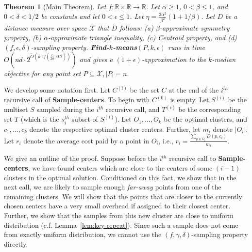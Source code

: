 \documentclass[11pt]{article}
\newtheorem{theorem}{Theorem}
\newcommand{\eps}{{\epsilon}}
\newcommand{\C}[1]{{{C}^{(#1)}}}
\newcommand{\itS}[1]{{{S}^{(#1)}}}
\newcommand{\itT}[1]{{{T}^{(#1)}}}
\begin{document}
\begin{theorem}[Main Theorem]\label{thm:other}
Let $f:\mathbb{R} \times \mathbb{R} \rightarrow \mathbb{R}$. 
Let $\alpha \geq 1$, $0 < \beta \leq 1$, and $0 < \delta < 1/2$ be constants and let $0 < \eps \leq 1$. Let $\eta = \frac{2\alpha^2}{\beta^2}(1 + 1/\beta)$. Let $D$ be a distance measure over space $\mathcal{X}$ that $D$ follows:
(a) $\beta$-approximate symmetry property,
(b) $\alpha$-approximate triangle inequality,
(c) Centroid property, and
(d) $(f, \epsilon, \delta)$-sampling property.
{\bf Find-$k$-means$\left(P, k, \eps \right)$} runs in time $O\left(nd  \cdot 2^{\tilde{O}\left(k \cdot f \left(\frac{\eps}{2 \eta}, 0.2 \right)\right)}\right)$ and gives a $(1 + \epsilon)$-approximation to the $k$-median objective for any point set $P \subseteq \mathcal{X}, |P| = n$.
\end{theorem}

We develop some notation first. 
Let $\C{i}$ be the set $C$ at the end of the $i^{th}$ recursive call of {\bf Sample-centers}.
To begin with $\C{0}$ is empty. 
Let $\itS{i}$ be the multiset $S$ sampled during the $i^{th}$ recursive call, and $\itT{i}$ be the corresponding set $T$ (which is the $s_i^{th}$ subset of $\itS{i}$).
Let $O_1, \ldots, O_k$ be the optimal clusters, and $c_1,...,c_k$ denote the respective optimal cluster centers. 
Further, let $m_i$ denote $|O_i|$.
Let $r_i$ denote the average cost paid by a point in $O_i$, i.e.,
$r_i = \frac{\sum_{p \in O_i} D(p,c_i)}{m_i}$.


We give an outline of the proof. 
Suppose before the  $i^{th}$ recursive call to {\bf Sample-centers}, 
we have found centers which are close to the centers of some $(i-1)$ clusters in the optimal solution. 
Conditioned on this fact, we show that in the next call, we are likely to sample enough {\em far-away} points from one of the remaining clusters.
We will show that the points that are closer to the currently chosen centers have a very small overhead if assigned to their closest center.
Further, we show that the samples from this new cluster are close to uniform distribution (c.f. Lemma~\ref{lem:key-repeat}). 
Since such a sample does not come from exactly uniform distribution, we cannot use the $(f, \gamma, \delta)$-sampling property directly. 
\end{document}
